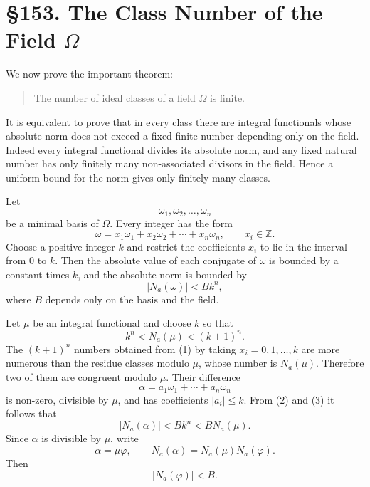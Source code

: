 \documentclass[12pt,a4paper]{article}
\newcommand{\webersection}[2]{\clearpage\section*{\S #1. #2}}
\begin{document}
\webersection{153}{The Class Number of the Field \(\Omega\)}

We now prove the important theorem:

\begin{quote}
The number of ideal classes of a field \(\Omega\) is finite.
\end{quote}
It is equivalent to prove that in every class there are integral functionals whose absolute norm does not exceed a fixed finite number depending only on the field.  Indeed every integral functional divides its absolute norm, and any fixed natural number has only finitely many non-associated divisors in the field.  Hence a uniform bound for the norm gives only finitely many classes.

Let
\[
 \omega_1,
\omega_2,
\ldots,
\omega_n
\]
be a minimal basis of \(\Omega\).  Every integer has the form
\begin{equation}
 \omega=x_1\omega_1+x_2\omega_2+
\cdots+x_n\omega_n,
\qquad x_i\in\mathbb Z. \tag{1}
\end{equation}
Choose a positive integer \(k\) and restrict the coefficients \(x_i\) to lie in the interval from \(0\) to \(k\).  Then the absolute value of each conjugate of \(\omega\) is bounded by a constant times \(k\), and the absolute norm is bounded by
\begin{equation}
 |N_a(\omega)|<Bk^n, \tag{2}
\end{equation}
where \(B\) depends only on the basis and the field.

Let \(\mu\) be an integral functional and choose \(k\) so that
\begin{equation}
 k^n<N_a(\mu)<(k+1)^n. \tag{3}
\end{equation}
The \((k+1)^n\) numbers obtained from (1) by taking \(x_i=0,1,
\ldots,k\) are more numerous than the residue classes modulo \(\mu\), whose number is \(N_a(\mu)\).  Therefore two of them are congruent modulo \(\mu\).  Their difference
\begin{equation}
 \alpha=a_1\omega_1+
\cdots+a_n\omega_n \tag{4}
\end{equation}
is non-zero, divisible by \(\mu\), and has coefficients \(|a_i|\le k\).  From (2) and (3) it follows that
\begin{equation}
 |N_a(\alpha)|<B k^n < B N_a(\mu). \tag{5}
\end{equation}
Since \(\alpha\) is divisible by \(\mu\), write
\begin{equation}
 \alpha=\mu\varphi,
\qquad N_a(\alpha)=N_a(\mu)N_a(\varphi). \tag{6}
\end{equation}
Then
\begin{equation}
 |N_a(\varphi)|<B. \tag{7}
\end{equation}
\end{document}

